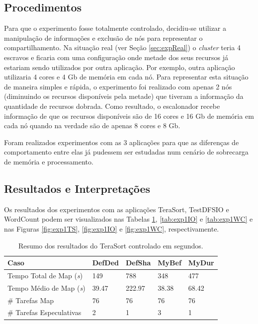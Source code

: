 \subsection{Procedimentos}
Para que o experimento fosse totalmente controlado, decidiu-se utilizar a manipulação de informações e exclusão de nós para representar o compartilhamento. Na situação real (ver Seção \ref{sec:expReal}) o \textit{cluster} teria 4 escravos e ficaria com uma configuração onde metade dos seus recursos já estariam sendo utilizados por outra aplicação. Por exemplo, outra aplicação utilizaria 4 cores e 4 Gb de memória em cada nó. Para representar esta situação de maneira simples e rápida, o experimento foi realizado com apenas 2 nós (diminuindo os recursos disponíveis pela metade) que tiveram a informação da quantidade de recursos dobrada. Como resultado, o escalonador recebe informação de que os recursos disponíveis são de 16 cores e 16 Gb de memória em cada nó quando na verdade são de apenas 8 cores e 8 Gb. 

Foram realizados experimentos com as 3 aplicações para que as diferenças de comportamento entre elas já pudessem ser estudadas num cenário de sobrecarga de memória e processamento.

\subsection{Resultados e Interpretações}
Os resultados dos experimentos com as aplicações TeraSort, TestDFSIO e WordCount podem ser visualizados nas Tabelas \ref{tab:exp1TS}, \ref{tab:exp1IO} e \ref{tab:exp1WC} e nas Figuras \ref{fig:exp1TS}, \ref{fig:exp1IO} e \ref{fig:exp1WC}, respectivamente.

\begin{table}[h!]
	\caption{Resumo dos resultados do TeraSort controlado em segundos.} \label{tab:exp1TS}
	\begin{tabular*}{\hsize}{lllll} %
		\textbf{Caso} & \textbf{DefDed} & \textbf{DefSha} & \textbf{MyBef} & \textbf{MyDur}\\
		\hline
		Tempo Total de Map ({\it{s}}) & 149 & 788 & 348 & 477 \\
		Tempo Médio de Map ({\it{s}}) & 39.47 & 222.97 & 38.38 & 68.42 \\
		\# Tarefas Map & 76 & 76 & 76 & 76 \\
		\# Tarefas Especulativas & 2 & 1 & 3 & 1 \\
	\end{tabular*}
\end{table}

